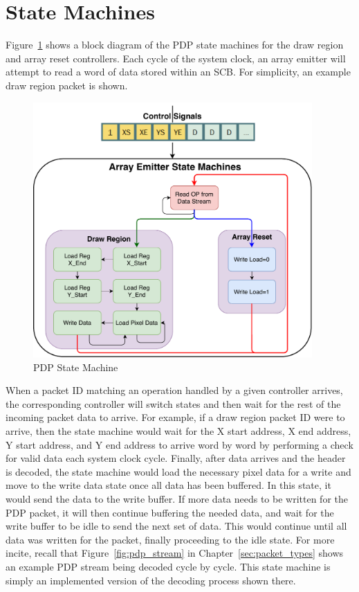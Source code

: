 \section{State Machines}
    \label{sec:state_machines}
    Figure~\ref{fig:state_machine} shows a block diagram of the PDP state machines for the draw region and array reset controllers. Each cycle of the system clock, an array emitter will attempt to read a word of data stored within an SCB. For simplicity, an example draw region packet is shown.

    \begin{figure}[t]
        \centering
        \includegraphics[width=0.95\textwidth]{fig/pdp_state_machine.pdf}
        \caption{PDP State Machine}
        \label{fig:state_machine}
    \end{figure}


    When a packet ID matching an operation handled by a given controller arrives, the corresponding controller will switch states and then wait for the rest of the incoming packet data to arrive. For example, if a draw region packet ID were to arrive, then the state machine would wait for the X start address, X end address, Y start address, and Y end address to arrive word by word by performing a check for valid data each system clock cycle. Finally, after data arrives and the header is decoded, the state machine would load the necessary pixel data for a write and move to the write data state once all data has been buffered. In this state, it would send the data to the write buffer. If more data needs to be written for the PDP packet, it will then continue buffering the needed data, and wait for the write buffer to be idle to send the next set of data. This would continue until all data was written for the packet, finally proceeding to the idle state. For more incite, recall that Figure~\ref{fig:pdp_stream} in Chapter~\ref{sec:packet_types} shows an example PDP stream being decoded cycle by cycle. This state machine is simply an implemented version of the decoding process shown there.

